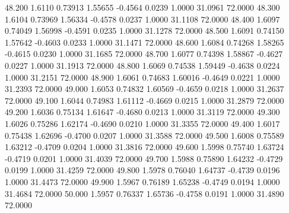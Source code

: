   48.200   1.6110   0.73913   1.55655  -0.4564   0.0239   1.0000  31.0961  72.0000
  48.300   1.6104   0.73969   1.56334  -0.4578   0.0237   1.0000  31.1108  72.0000
  48.400   1.6097   0.74049   1.56998  -0.4591   0.0235   1.0000  31.1278  72.0000
  48.500   1.6091   0.74150   1.57642  -0.4603   0.0233   1.0000  31.1471  72.0000
  48.600   1.6084   0.74268   1.58265  -0.4615   0.0230   1.0000  31.1685  72.0000
  48.700   1.6077   0.74398   1.58867  -0.4627   0.0227   1.0000  31.1913  72.0000
  48.800   1.6069   0.74538   1.59449  -0.4638   0.0224   1.0000  31.2151  72.0000
  48.900   1.6061   0.74683   1.60016  -0.4649   0.0221   1.0000  31.2393  72.0000
  49.000   1.6053   0.74832   1.60569  -0.4659   0.0218   1.0000  31.2637  72.0000
  49.100   1.6044   0.74983   1.61112  -0.4669   0.0215   1.0000  31.2879  72.0000
  49.200   1.6036   0.75134   1.61647  -0.4680   0.0213   1.0000  31.3119  72.0000
  49.300   1.6026   0.75286   1.62174  -0.4690   0.0210   1.0000  31.3355  72.0000
  49.400   1.6017   0.75438   1.62696  -0.4700   0.0207   1.0000  31.3588  72.0000
  49.500   1.6008   0.75589   1.63212  -0.4709   0.0204   1.0000  31.3816  72.0000
  49.600   1.5998   0.75740   1.63724  -0.4719   0.0201   1.0000  31.4039  72.0000
  49.700   1.5988   0.75890   1.64232  -0.4729   0.0199   1.0000  31.4259  72.0000
  49.800   1.5978   0.76040   1.64737  -0.4739   0.0196   1.0000  31.4473  72.0000
  49.900   1.5967   0.76189   1.65238  -0.4749   0.0194   1.0000  31.4684  72.0000
  50.000   1.5957   0.76337   1.65736  -0.4758   0.0191   1.0000  31.4890  72.0000
